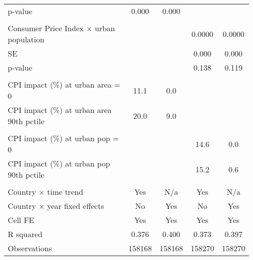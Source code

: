 {\begin{tabular}{l*{4}{c}}
\hspace{15pt} p-value&       0.000         &       0.000         &                     &                     \\
\\ Consumer Price Index $\times$ urban population&                     &                     &      0.0000         &      0.0000         \\
\hspace{15pt} SE    &                     &                     &       0.000         &       0.000         \\
\hspace{15pt} p-value&                     &                     &       0.138         &       0.119         \\
\hline \\ CPI impact (\%) at urban area = 0 &        11.1         &         0.0         &                     &                     \\
CPI impact (\%) at urban area 90th pctile&        20.0         &         9.0         &                     &                     \\
\\ CPI impact (\%) at urban pop = 0&                     &                     &        14.6         &         0.0         \\
CPI impact (\%) at urban pop 90th pctile&                     &                     &        15.2         &         0.6         \\
\hline \\ Country $\times$ time trend&         Yes         &         N/a         &         Yes         &         N/a         \\
Country $\times$ year fixed effects&          No         &         Yes         &          No         &         Yes         \\
Cell FE             &         Yes         &         Yes         &         Yes         &         Yes         \\
R squared           &       0.376         &       0.400         &       0.373         &       0.397         \\
Observations        &      158168         &      158168         &      158270         &      158270         \\
\hline\hline
\end{tabular}
}
